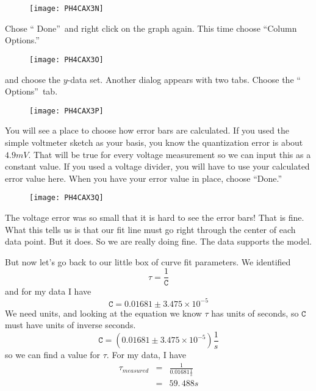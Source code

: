 \begin{figure}[h!]
\texttt{[image: PH4CAX3N]}
\end{figure}Chose \textquotedblleft
Done\textquotedblright\ and right click on the graph again. This time choose
\textquotedblleft Column Options.\textquotedblright\ \begin{figure}[h!]
\texttt{[image: PH4CAX3O]}
\end{figure}and choose the $y$-data set.
Another dialog appears with two tabs. Choose the \textquotedblleft
Options\textquotedblright\ tab. \begin{figure}[h!]
\texttt{[image: PH4CAX3P]}
\end{figure}

You will see a place to choose how error bars are calculated. If you used
the simple voltmeter sketch as your basis, you know the quantization error
is about $4.9\unit{mV}.$ That will be true for every voltage measurement so
we can input this as a constant value. If you used a voltage divider, you
will have to use your calculated error value here. When you have your error
value in place, choose \textquotedblleft Done.\textquotedblright\ \begin{figure}[h!]
\texttt{[image: PH4CAX3Q]}
\end{figure}

The voltage error was so small that it is hard to see the error bars! That
is fine. What this tells us is that our fit line must go right through the
center of each data point. But it does. So we are really doing fine. The
data supports the model.

But now let's go back to our little box of curve fit parameters. We
identified 
\begin{equation*}
\tau =\frac{1}{\mathtt{C}}
\end{equation*}%
and for my data I have 
\begin{equation*}
\mathtt{C}=0.01681\pm 3.475\times 10^{-5}
\end{equation*}%
\newline
We need units, and looking at the equation we know $\tau $ has units of
seconds, so $\mathtt{C}$ must have units of inverse seconds.%
\begin{equation*}
\mathtt{C}=\left( 0.01681\pm 3.475\times 10^{-5}\right) \frac{1}{\unit{s}}
\end{equation*}%
so we can find a value for $\tau .$ For my data, I have 
\begin{eqnarray*}
\tau _{measured} &=&\frac{1}{0.01681\frac{1}{\unit{s}}} \\
&=&59.\,\allowbreak 488\unit{s}
\end{eqnarray*}

